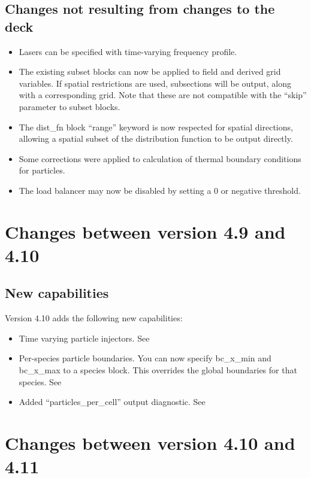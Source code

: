 \subsection{Changes not resulting from changes to the deck}
\begin{itemize}
\item Lasers can be specified with time-varying frequency profile.
\item The existing subset blocks can now be applied to field and derived grid
  variables. If spatial restrictions are used, subsections will be output,
  along with a corresponding grid.
  Note that these are not compatible with the ``skip'' parameter to subset
  blocks.
\item The dist\_fn block ``range'' keyword is now respected for spatial
  directions, allowing a spatial subset of the distribution function to be
  output directly.
\item Some corrections were applied to calculation of thermal boundary
  conditions for particles.
\item The load balancer may now be disabled by setting a 0 or negative
  threshold.
\end{itemize}
\bigskip


\section{Changes between version 4.9 and 4.10}

\subsection{New capabilities}
Version 4.10 adds the following new capabilities:

\begin{itemize}
\item Time varying particle injectors. See 
\item Per-species particle boundaries. You can now specify bc\_x\_min and
   bc\_x\_max to a species block. This overrides the global boundaries for that
   species. See 
\item Added ``particles\_per\_cell'' output diagnostic.
   See 
\end{itemize}
\bigskip


\section{Changes between version 4.10 and 4.11}

